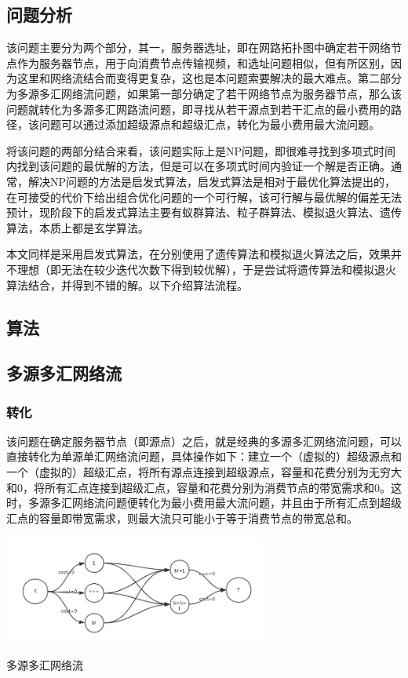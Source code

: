 \documentclass[a4paper,11pt,onecolumn,twoside]{article}
\makeatletter
\newenvironment{figurehere}
  {\def\@captype{figure}}
  {}
\makeatother
\begin{document}
\begin{multicols}{2}
\subsection{问题分析}

该问题主要分为两个部分，其一，服务器选址，即在网路拓扑图中确定若干网络节点作为服务器节点，用于向消费节点传输视频，和选址问题相似，但有所区别，因为这里和网络流结合而变得更复杂，这也是本问题索要解决的最大难点。第二部分为多源多汇网络流问题，如果第一部分确定了若干网络节点为服务器节点，那么该问题就转化为多源多汇网路流问题，即寻找从若干源点到若干汇点的最小费用的路径，该问题可以通过添加超级源点和超级汇点，转化为最小费用最大流问题。

将该问题的两部分结合来看，该问题实际上是NP问题，即很难寻找到多项式时间内找到该问题的最优解的方法，但是可以在多项式时间内验证一个解是否正确。通常，解决NP问题的方法是启发式算法，启发式算法是相对于最优化算法提出的，在可接受的代价下给出组合优化问题的一个可行解，该可行解与最优解的偏差无法预计，现阶段下的启发式算法主要有蚁群算法、粒子群算法、模拟退火算法、遗传算法，本质上都是玄学算法。

本文同样是采用启发式算法，在分别使用了遗传算法和模拟退火算法之后，效果并不理想（即无法在较少迭代次数下得到较优解），于是尝试将遗传算法和模拟退火算法结合，并得到不错的解。以下介绍算法流程。

\subsection{算法}

\subsection{多源多汇网络流}
\subsubsection{转化}
该问题在确定服务器节点（即源点）之后，就是经典的多源多汇网络流问题，可以直接转化为单源单汇网络流问题，具体操作如下：建立一个（虚拟的）超级源点和一个（虚拟的）超级汇点，将所有源点连接到超级源点，容量和花费分别为无穷大和0，将所有汇点连接到超级汇点，容量和花费分别为消费节点的带宽需求和0。这时，多源多汇网络流问题便转化为最小费用最大流问题，并且由于所有汇点到超级汇点的容量即带宽需求，则最大流只可能小于等于消费节点的带宽总和。

\begin{figurehere}
	\centering
	\includegraphics[width=3.4in]{imgs/多源多汇网络流}
	\caption{多源多汇网络流}
	\label{dydhwll}
\end{figurehere}


\end{multicols}
\end{document}
